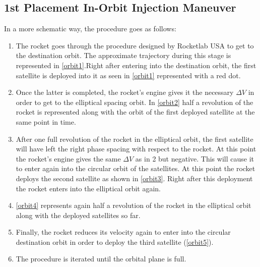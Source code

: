 \subsection{1st Placement In-Orbit Injection Maneuver}
In a more schematic way, the procedure goes as follows:
\begin{enumerate}
\item The rocket goes through the procedure designed by Rocketlab USA to get to the destination orbit. The approximate trajectory during this stage is represented in \ref{orbit1}.Right after entering into the destination orbit, the first satellite is deployed into it as seen in \ref{orbit1} represented with a red dot.
\item Once the latter is completed, the rocket's engine gives it the necessary $\Delta V$ in order to get to the elliptical spacing orbit. In \ref{orbit2} half a revolution of the rocket is represented along with the orbit of the first deployed satellite at the same point in time.
\item After one full revolution of the rocket in the elliptical orbit, the first satellite will have left the right phase spacing with respect to the rocket. At this point the rocket's engine gives the same $\Delta V$ as in 2 but negative. This will cause it to enter again into the circular orbit of the satellites. At this point the rocket deploys the second satellite as shown in \ref{orbit3}. Right after this deployment the rocket enters into the elliptical orbit again.
\item \ref{orbit4} represents again half a revolution of the rocket in the elliptical orbit along with the deployed satellites so far.
\item Finally, the rocket reduces its velocity again to enter into the circular destination orbit in order to deploy the third satellite (\ref{orbit5}).
\item The procedure is iterated until the orbital plane is full.
\newline\newline
\end{enumerate}
